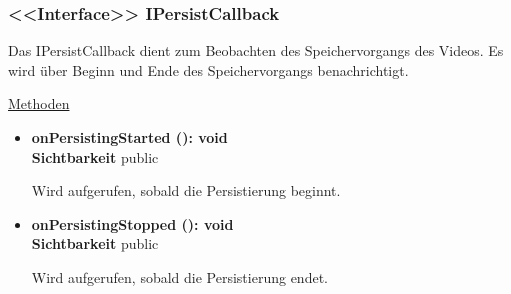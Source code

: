 \subsubsection{<<Interface>> IPersistCallback} \label{app:klasse:IPersistCallback}
Das IPersistCallback dient zum Beobachten des Speichervorgangs des Videos. Es wird über Beginn und Ende des Speichervorgangs benachrichtigt.
\newline

\underline{Methoden}
\begin{itemize}
\itemsep0pt
\item \textbf{onPersistingStarted (): void}\hfill\\
\textbf{Sichtbarkeit} public

Wird aufgerufen, sobald die Persistierung beginnt.

\item \textbf{onPersistingStopped (): void}\hfill\\
\textbf{Sichtbarkeit} public

Wird aufgerufen, sobald die Persistierung endet.

\end{itemize}